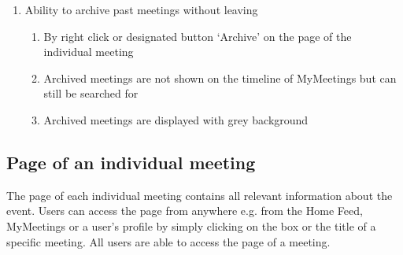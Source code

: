 \documentclass[conference]{IEEEtran}
\begin{document}
\begin{enumerate}
\begin{enumerate}
\begin{enumerate}
        \end{enumerate}
        \item Ability to archive past meetings without leaving
        \begin{enumerate}
        \item By right click or designated button ‘Archive’ on the page of the individual meeting
        \item Archived meetings are not shown on the timeline of MyMeetings but can still be searched for
        \item Archived meetings are displayed with grey background
        \end{enumerate}
    \end{enumerate}
\end{enumerate}

\subsection{Page of an individual meeting}

The page of each individual meeting contains all relevant information about the event. Users can access the page from anywhere e.g. from the Home Feed, MyMeetings or a user’s profile by simply clicking on the box or the title of a specific meeting. All users are able to access the page of a meeting.
\end{document}
